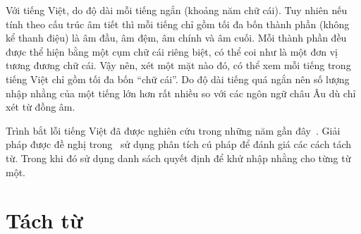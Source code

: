 \documentclass[a4paper,oneside,14pt]{extbook} %
\begin{document}
Với tiếng Việt, do độ dài mỗi tiếng ngắn (khoảng năm chữ cái). Tuy
nhiên nếu tính theo cấu trúc âm tiết thì mỗi tiếng chỉ gồm tối đa bốn
thành phần (không kể thanh điệu) là âm đầu, âm đệm, âm chính và âm
cuối. Mỗi thành phần đều được thể hiện bằng một cụm chữ cái riêng
biệt, có thể coi như là một đơn vị tương đương chữ cái. Vậy nên, xét
một mặt nào đó, có thể xem mỗi tiếng trong tiếng Việt chỉ gồm tối đa
bốn ``chữ cái''. Do độ dài tiếng quá ngắn nên số lượng nhập nhằng của
một tiếng lớn hơn rất nhiều so với các ngôn ngữ châu Âu dù chỉ xét
từ đồng âm.

Trình bắt lỗi tiếng Việt đã được nghiên cứu trong những năm gần
đây~\cite{Tuoi,vietdecisionlist}. Giải pháp được đề nghị
trong~\cite{Tuoi} sử dụng phân tích cú pháp để đánh giá các cách tách
từ. Trong khi đó \cite{vietdecisionlist} sử dụng danh sách quyết định
để khử nhập nhằng cho từng từ một.



\section{Tách từ}






\end{document}
